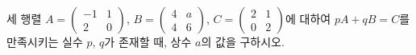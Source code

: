 \hspace*{2mm}\begin{minipage}[t]{\dimexpr\linewidth-2mm\relax}\vspace{0pt}
세 행렬 $A=\begin{pmatrix} -1 & 1 \\ 2 & 0 \end{pmatrix}$, $B=\begin{pmatrix} 4 & a \\ 4 & 6 \end{pmatrix}$, $C=\begin{pmatrix} 2 & 1 \\ 0 & 2 \end{pmatrix}$에 대하여 $pA+qB=C$를 만족시키는 실수 $p$, $q$가 존재할 때, 상수 $a$의 값을 구하시오.\end{minipage}
